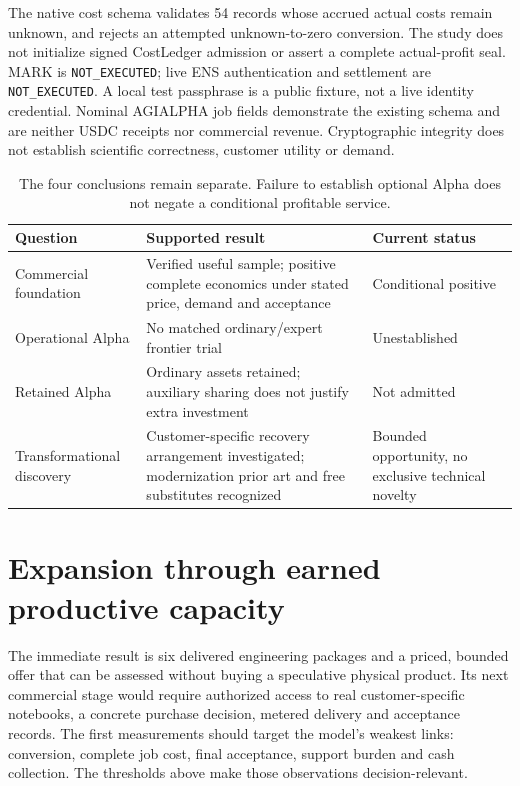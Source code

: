 The native cost schema validates 54 records whose accrued actual costs remain unknown, and rejects an attempted unknown-to-zero conversion. The study does not initialize signed CostLedger admission or assert a complete actual-profit seal. MARK is \texttt{NOT\_EXECUTED}; live ENS authentication and settlement are \texttt{NOT\_EXECUTED}. A local test passphrase is a public fixture, not a live identity credential. Nominal AGIALPHA job fields demonstrate the existing schema and are neither USDC receipts nor commercial revenue. Cryptographic integrity does not establish scientific correctness, customer utility or demand.

\begin{table}[htbp]\centering\small
\begin{tabularx}{\linewidth}{@{}p{.25\linewidth}Yp{.23\linewidth}@{}}\toprule
Question & Supported result & Current status\\\midrule
Commercial foundation & Verified useful sample; positive complete economics under stated price, demand and acceptance & Conditional positive\\
Operational Alpha & No matched ordinary/expert frontier trial & Unestablished\\
Retained Alpha & Ordinary assets retained; auxiliary sharing does not justify extra investment & Not admitted\\
Transformational discovery & Customer-specific recovery arrangement investigated; modernization prior art and free substitutes recognized & Bounded opportunity, no exclusive technical novelty\\\bottomrule
\end{tabularx}
\caption{The four conclusions remain separate. Failure to establish optional Alpha does not negate a conditional profitable service.}
\end{table}

\section{Expansion through earned productive capacity}
The immediate result is six delivered engineering packages and a priced, bounded offer that can be assessed without buying a speculative physical product. Its next commercial stage would require authorized access to real customer-specific notebooks, a concrete purchase decision, metered delivery and acceptance records. The first measurements should target the model's weakest links: conversion, complete job cost, final acceptance, support burden and cash collection. The thresholds above make those observations decision-relevant.

